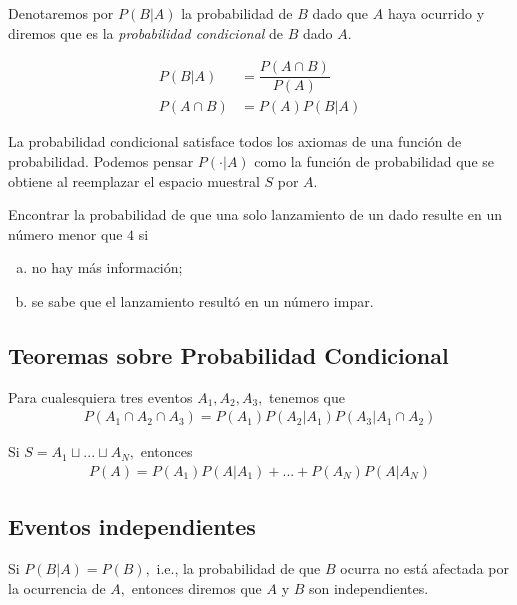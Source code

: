   Denotaremos por $P(B|A)$
 la probabilidad de $B$ dado que $A$ haya ocurrido y diremos que es la \emph{probabilidad condicional} de $B$ dado $A.$


\begin{defn}
 \begin{align}
  P(B|A)&=\dfrac{P(A\cap B)}{P(A)} \\
  P(A\cap B) &= P(A)P(B|A)
 \end{align}
\end{defn}


{}
\begin{rem}
 La probabilidad condicional satisface todos los axiomas de una función de probabilidad.  Podemos pensar $P(\cdot|A)$ como la función de probabilidad que se obtiene al reemplazar el espacio muestral $S$ por $A.$
\end{rem}


{}
\begin{ejemplo}
 \label{exmp:0.1.13}
 Encontrar la probabilidad de que una solo lanzamiento de un dado resulte en un número menor que $4$ si
 \begin{enumerate}[(a)]
  \item no hay más información; 
  \item se sabe que el lanzamiento resultó en un número impar.
 \end{enumerate}

\end{ejemplo}


\subsection{Teoremas sobre Probabilidad Condicional}
{}
\begin{thm}
 \label{thm:0.1.9}
 Para cualesquiera tres eventos $A_{1},A_{2},A_{3},$ tenemos que
 \begin{align}
  \label{eq:0.1.19}
  P(A_{1} \cap A_{2} \cap A_{3})=P(A_{1})P(A_{2}|A_{1})P(A_{3}|A_{1} \cap A_{2})
 \end{align}
\end{thm}


{}
\begin{thm}
 \label{thm:0.1.10} Si $S=A_{1}\sqcup ... \sqcup A_{N},$  entonces
 \begin{align}
\label{eq:0.1.20}
P(A)=P(A_{1})P(A|A_{1})+...+P(A_{N})P(A|A_{N})
\end{align}
\end{thm}


\subsection{Eventos independientes}
{}
Si $P(B|A)=P(B),$ i.e., la probabilidad de que $B$ ocurra no está afectada por la ocurrencia de $A,$ entonces diremos que $A$ y $B$ son independientes.


